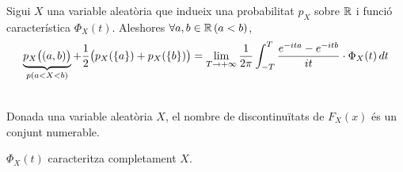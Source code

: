 \begin{thm}[(d'inversió)]
  Sigui $X$ una variable aleatòria que indueix una probabilitat $p_{X}$ sobre $\mathbb{R}$ i funció característica $\Phi_{X}(t)$. Aleshores $\forall a,b\in \mathbb{R} \, (a<b)$,
  \[
    \underbrace{p_{X}\big((a,b)\big)}_{p(a<X<b)} + \frac{1}{2}\big(p_{X}(\left\{a\right\})+p_{X}(\left\{b\right\}) \big) = \lim_{T\to+\infty}\frac{1}{2\pi}\int_{-T}^{T}\frac{e^{-ita}-e^{-itb}}{it}\cdot\Phi_{X}(t) \, dt
  \]
\end{thm}

\begin{lema} \-\\
  Donada una variable aleatòria $X$, el nombre de discontinuïtats de $F_{X}(x)$ és un conjunt numerable.
\end{lema}

\begin{col}
  $\Phi_{X}(t)$ caracteritza completament $X$.
\end{col}
